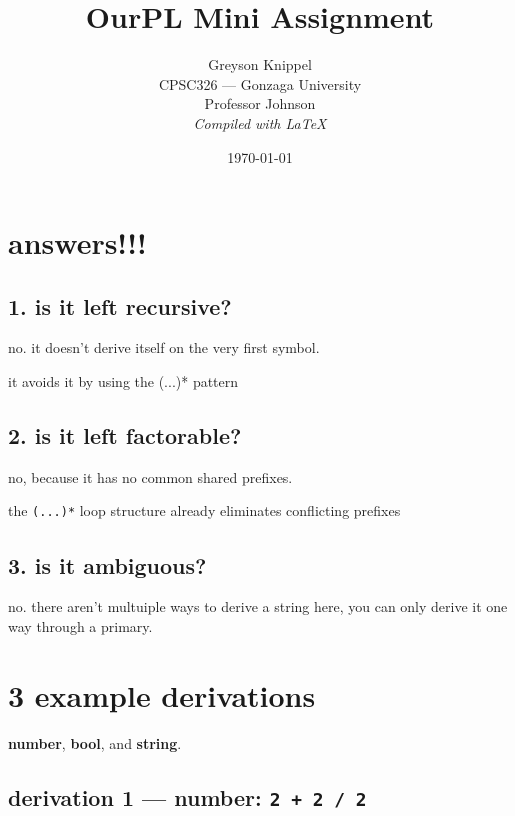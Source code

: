 \documentclass[12pt]{article}
\title{OurPL Mini Assignment}
\author{
Greyson Knippel \\[4pt]
CPSC326 --- Gonzaga University \\[4pt]
Professor Johnson \\[4pt]
\textit{Compiled with \LaTeX}
}
\date{\today}
\begin{document}
\maketitle

\section*{answers!!!}


\subsection*{1. is it left recursive?}

no. it doesn't derive itself on the very first symbol.

it avoids it by using the (...)* pattern

\subsection*{2. is it left factorable?}

no, because it has no common shared prefixes.

the \texttt{(...)*} loop structure already eliminates conflicting prefixes

\subsection*{3. is it ambiguous?}

no. there aren't multuiple ways to derive a string here, you can only derive it one way through a primary.

\section*{3 example derivations}

\textbf{number}, \textbf{bool}, and \textbf{string}.

\subsection*{derivation 1 --- number: \texttt{2 + 2 / 2}}
\end{document}
